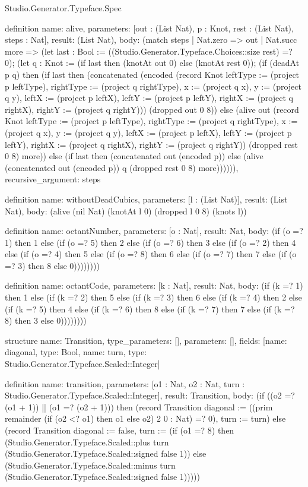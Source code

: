\begin{lexlean}{Studio.Generator.Typeface.Spec}
\begin{semanticmodule}
definition{
  name: alive,
  parameters: [out : (List Nat), p : Knot, rest : (List Nat), steps : Nat],
  result: (List Nat),
  body: (match steps
    | Nat.zero => out
    | Nat.succ more => (let last : Bool := ((Studio.Generator.Typeface.Choices::size rest) =? 0); (let q : Knot := (if last then (knotAt out 0) else (knotAt rest 0)); (if (deadAt p q) then (if last then (concatenated (encoded (record Knot {leftType := (project p leftType), rightType := (project q rightType), x := (project q x), y := (project q y), leftX := (project p leftX), leftY := (project p leftY), rightX := (project q rightX), rightY := (project q rightY)})) (dropped out 0 8)) else (alive out (record Knot {leftType := (project p leftType), rightType := (project q rightType), x := (project q x), y := (project q y), leftX := (project p leftX), leftY := (project p leftY), rightX := (project q rightX), rightY := (project q rightY)}) (dropped rest 0 8) more)) else (if last then (concatenated out (encoded p)) else (alive (concatenated out (encoded p)) q (dropped rest 0 8) more)))))),
  recursive_argument: steps
}

definition{
  name: withoutDeadCubics,
  parameters: [l : (List Nat)],
  result: (List Nat),
  body: (alive (nil Nat) (knotAt l 0) (dropped l 0 8) (knots l))
}

definition{
  name: octantNumber,
  parameters: [o : Nat],
  result: Nat,
  body: (if (o =? 1) then 1 else (if (o =? 5) then 2 else (if (o =? 6) then 3 else (if (o =? 2) then 4 else (if (o =? 4) then 5 else (if (o =? 8) then 6 else (if (o =? 7) then 7 else (if (o =? 3) then 8 else 0))))))))
}

definition{
  name: octantCode,
  parameters: [k : Nat],
  result: Nat,
  body: (if (k =? 1) then 1 else (if (k =? 2) then 5 else (if (k =? 3) then 6 else (if (k =? 4) then 2 else (if (k =? 5) then 4 else (if (k =? 6) then 8 else (if (k =? 7) then 7 else (if (k =? 8) then 3 else 0))))))))
}

structure{
  name: Transition,
  type_parameters: [],
  parameters: [],
  fields: [{name: diagonal, type: Bool}, {name: turn, type: Studio.Generator.Typeface.Scaled::Integer}]
}

definition{
  name: transition,
  parameters: [o1 : Nat, o2 : Nat, turn : Studio.Generator.Typeface.Scaled::Integer],
  result: Transition,
  body: (if ((o2 =? (o1 + 1)) || (o1 =? (o2 + 1))) then (record Transition {diagonal := ((prim remainder (if (o2 <? o1) then o1 else o2) 2 0 : Nat) =? 0), turn := turn}) else (record Transition {diagonal := false, turn := (if (o1 =? 8) then (Studio.Generator.Typeface.Scaled::plus turn (Studio.Generator.Typeface.Scaled::signed false 1)) else (Studio.Generator.Typeface.Scaled::minus turn (Studio.Generator.Typeface.Scaled::signed false 1)))}))
}


\end{semanticmodule}
\end{lexlean}
